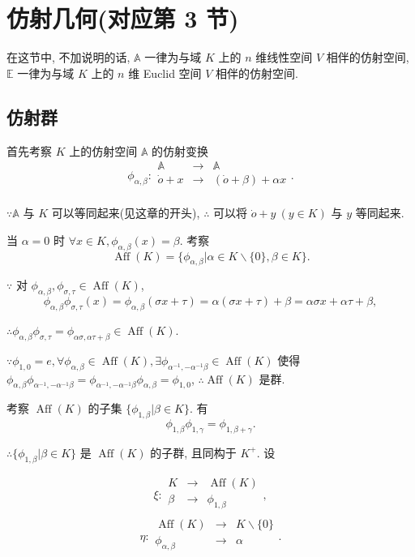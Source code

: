 \documentclass{ctexart}
\begin{document}
\section{仿射几何(对应第 3 节)}
在这节中, 不加说明的话, $\mathbb{A}$ 一律为与域 $K$ 上的 $n$ 维线性空间 $V$ 相伴的仿射空间, $\mathbb{E}$ 一律为与域 $K$ 上的 $n$ 维 Euclid 空间 $V$ 相伴的仿射空间.
\subsection{仿射群}
首先考察 $K$ 上的仿射空间 $\mathbb{A}$ 的仿射变换
\[\phi_{\alpha,\beta}:\begin{array}{rcl}
    \mathbb{A} & \to & \mathbb{A} \\
    \dot{o}+x & \to & (\dot{o}+\beta)+\alpha x \\
\end{array}.\]

$\because\mathbb{A}$ 与 $K$ 可以等同起来(见这章的开头), $\therefore$ 可以将 $\dot{o}+y\ (y\in K)$ 与 $y$ 等同起来.

当 $\alpha=0$ 时 $\forall x\in K,\phi_{\alpha,\beta}(x)=\beta$. 考察
\[\operatorname{Aff}(K)=\{\phi_{\alpha,\beta}|\alpha\in K\backslash\{0\},\beta\in K\}.\]

$\because$ 对 $\phi_{\alpha,\beta},\phi_{\sigma,\tau}\in\operatorname{Aff}(K)$,
\[\phi_{\alpha,\beta}\phi_{\sigma,\tau}(x)=\phi_{\alpha,\beta}(\sigma x+\tau)=\alpha(\sigma x+\tau)+\beta=\alpha\sigma x+\alpha\tau+\beta,\]

$\therefore\phi_{\alpha,\beta}\phi_{\sigma,\tau}=\phi_{\alpha\sigma,\alpha\tau+\beta}\in\operatorname{Aff}(K)$.

$\because\phi_{1,0}=e,\forall\phi_{\alpha,\beta}\in\operatorname{Aff}(K),\exists\phi_{\alpha^{-1},-\alpha^{-1}\beta}\in\operatorname{Aff}(K)$ 使得 $\phi_{\alpha,\beta}\phi_{\alpha^{-1},-\alpha^{-1}\beta}=\phi_{\alpha^{-1},-\alpha^{-1}\beta}\phi_{\alpha,\beta}=\phi_{1,0}$, $\therefore\operatorname{Aff}(K)$ 是群.

考察 $\operatorname{Aff}(K)$ 的子集 $\{\phi_{1,\beta}|\beta\in K\}$. 有
\[\phi_{1,\beta}\phi_{1,\gamma}=\phi_{1,\beta+\gamma}.\]

$\therefore\{\phi_{1,\beta}|\beta\in K\}$ 是 $\operatorname{Aff}(K)$ 的子群, 且同构于 $K^+$. 设

\[\xi:\begin{array}{rcl}
    K & \to & \operatorname{Aff}(K) \\
    \beta & \to & \phi_{1,\beta} \\
\end{array},\]
\[\eta:\begin{array}{rcl}
    \operatorname{Aff}(K) & \to & K\backslash\{0\} \\
    \phi_{\alpha,\beta} & \to & \alpha \\
\end{array}.\]
\end{document}
